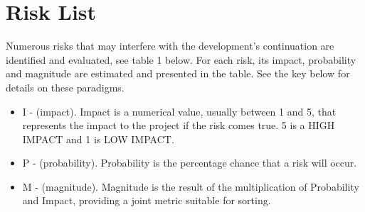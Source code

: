 \documentclass[12pt]{article}
\begin{document}
\iffalse
\section{Identified risks}
Several risks that may arise throughout development were identified. \par
\fi

\section{Risk List}
Numerous risks that may interfere with the development's continuation are identified and evaluated, see table 1 below. For each risk, its impact, probability and magnitude are estimated and presented in the table. See the key below for details on these paradigms. 

\begin{itemize}
\item I - (impact). Impact is a numerical value, usually between 1 and 5, that represents the impact to the project if the risk comes true. 5 is a HIGH IMPACT and 1 is LOW IMPACT.
\item P - (probability). Probability is the percentage chance that a risk will occur.
\item M - (magnitude). Magnitude is the result of the multiplication of Probability and Impact, providing a joint metric suitable for sorting.
\end{itemize}
\par
\end{document}
